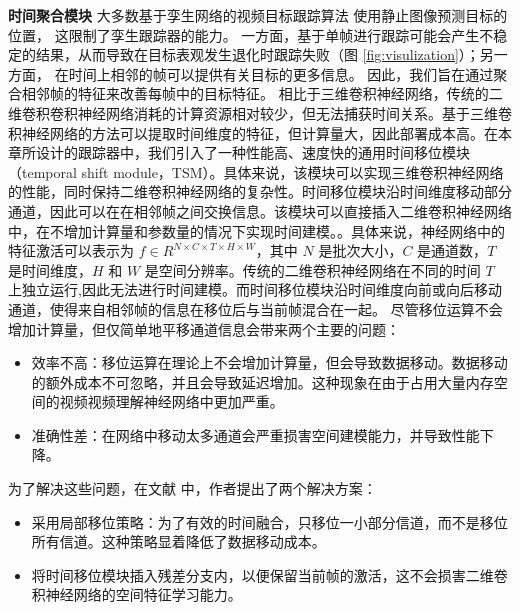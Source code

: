 \textbf{时间聚合模块}
大多数基于孪生网络的视频目标跟踪算法 \cite{SiamRPN++, Wang2018SiamMask} 使用静止图像预测目标的位置，%
这限制了孪生跟踪器的能力。
一方面，基于单帧进行跟踪可能会产生不稳定的结果，从而导致在目标表观发生退化时跟踪失败（图 \ref{fig:visulization}）；另一方面，
在时间上相邻的帧可以提供有关目标的更多信息。
因此，我们旨在通过聚合相邻帧的特征来改善每帧中的目标特征。
相比于三维卷积神经网络，传统的二维卷积卷积神经网络消耗的计算资源相对较少，但无法捕获时间关系。基于三维卷积神经网络的方法可以提取时间维度的特征，但计算量大，因此部署成本高。在本章所设计的跟踪器中，我们引入了一种性能高、速度快的通用时间移位模块（temporal shift module，TSM）。具体来说，该模块可以实现三维卷积神经网络的性能，同时保持二维卷积神经网络的复杂性。时间移位模块沿时间维度移动部分通道，因此可以在在相邻帧之间交换信息。该模块可以直接插入二维卷积神经网络中，在不增加计算量和参数量的情况下实现时间建模。。具体来说，神经网络中的特征激活可以表示为 $f \in R^{N\times C\times T\times H\times W}$，其中 $N$ 是批次大小，$C$ 是通道数，$T$ 是时间维度，$H$ 和 $W$ 是空间分辨率。传统的二维卷积神经网络在不同的时间 $T$ 上独立运行,因此无法进行时间建模。而时间移位模块沿时间维度向前或向后移动通道，使得来自相邻帧的信息在移位后与当前帧混合在一起。
尽管移位运算不会增加计算量，但仅简单地平移通道信息会带来两个主要的问题：
\begin{itemize}
\item 效率不高：移位运算在理论上不会增加计算量，但会导致数据移动。数据移动的额外成本不可忽略，并且会导致延迟增加。这种现象在由于占用大量内存空间的视频视频理解神经网络中更加严重。
\item 准确性差：在网络中移动太多通道会严重损害空间建模能力，并导致性能下降。
\end{itemize}
为了解决这些问题，在文献 \cite{lin2019tsm} 中，作者提出了两个解决方案：
\begin{itemize}
\item 采用局部移位策略：为了有效的时间融合，只移位一小部分信道，而不是移位所有信道。这种策略显着降低了数据移动成本。
\item 将时间移位模块插入残差分支内，以便保留当前帧的激活，这不会损害二维卷积神经网络的空间特征学习能力。
\end{itemize}
